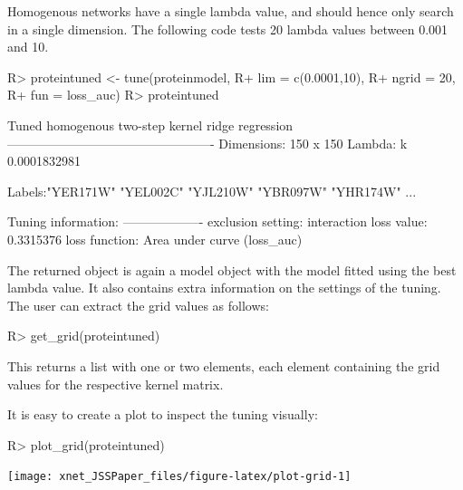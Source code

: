 \documentclass[
]{article}
\begin{document}
Homogenous networks have a single lambda value, and should hence only
search in a single dimension. The following code tests 20 lambda values
between 0.001 and 10.

\begin{CodeChunk}

\begin{CodeInput}
R> proteintuned <- tune(proteinmodel,
R+                      lim = c(0.0001,10),
R+                      ngrid = 20,
R+                      fun = loss_auc)
R> proteintuned
\end{CodeInput}

\begin{CodeOutput}
Tuned homogenous two-step kernel ridge regression
-------------------------------------------------
Dimensions: 150 x 150 
Lambda:
           k 
0.0001832981 

Labels:"YER171W" "YEL002C" "YJL210W" "YBR097W" "YHR174W" ...

Tuning information:
-------------------
exclusion setting: interaction 
loss value: 0.3315376 
loss function: Area under curve (loss_auc) 
\end{CodeOutput}
\end{CodeChunk}

The returned object is again a model object with the model fitted using
the best lambda value. It also contains extra information on the
settings of the tuning. The user can extract the grid values as follows:

\begin{CodeChunk}

\begin{CodeInput}
R> get_grid(proteintuned)
\end{CodeInput}

\end{CodeChunk}

This returns a list with one or two elements, each element containing
the grid values for the respective kernel matrix.

It is easy to create a plot to inspect the tuning visually:

\begin{CodeChunk}

\begin{CodeInput}
R> plot_grid(proteintuned)
\end{CodeInput}


\begin{center}\texttt{[image: xnet\_JSSPaper\_files/figure-latex/plot-grid-1]} \end{center}

\end{CodeChunk}
\end{document}
